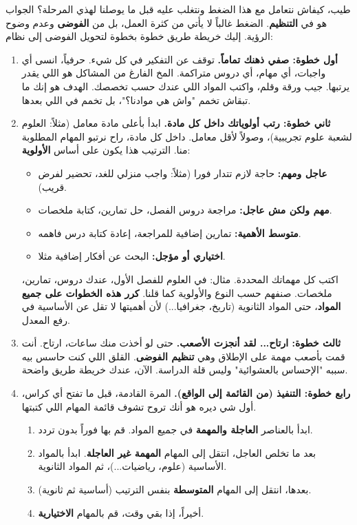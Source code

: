 \documentclass[12pt,a4paper]{book}
\begin{document}
	طيب، كيفاش نتعامل مع هذا الضغط ونتغلب عليه قبل ما يوصلنا لهذي المرحلة؟ الجواب هو في \textbf{التنظيم}. الضغط غالباً لا يأتي من كثرة العمل، بل من \textbf{الفوضى} وعدم وضوح الرؤية. إليك خريطة طريق خطوة بخطوة لتحويل الفوضى إلى نظام:
	
	\begin{enumerate}
		\item \textbf{أول خطوة: صفي ذهنك تماماً.}
		توقف عن التفكير في كل شيء. حرفياً، انسى أي واجبات، أي مهام، أي دروس متراكمة. المخ الفارغ من المشاكل هو اللي يقدر يرتبها. جيب ورقة وقلم، واكتب المواد اللي عندك حسب تخصصك. الهدف هو إنك ما تبقاش تخمم "واش هي موادنا؟"، بل تخمم في اللي بعدها.
		
		\item \textbf{ثاني خطوة: رتب أولوياتك داخل كل مادة.}
		ابدأ بأعلى مادة معامل (مثلاً: العلوم لشعبة علوم تجريبية)، وصولاً لأقل معامل. داخل كل مادة، راح نرتبو المهام المطلوبة منا. الترتيب هذا يكون على أساس \textbf{الأولوية}:
		\begin{itemize}
			\item \textbf{عاجل ومهم:} حاجة لازم تتدار فورا (مثلاً: واجب منزلي للغد، تحضير لفرض قريب).
			\item \textbf{مهم ولكن مش عاجل:} مراجعة دروس الفصل، حل تمارين، كتابة ملخصات.
			\item \textbf{متوسط الأهمية:} تمارين إضافية للمراجعة، إعادة كتابة درس فاهمه.
			\item \textbf{اختياري أو مؤجل:} البحث عن أفكار إضافية مثلا.
		\end{itemize}
		اكتب كل مهماتك المحددة. مثال: في العلوم للفصل الأول، عندك دروس، تمارين، ملخصات. صنفهم حسب النوع والأولوية كما قلنا. \textbf{كرر هذه الخطوات على جميع المواد}، حتى المواد الثانوية (تاريخ، جغرافيا...) لأن أهميتها لا تقل عن الأساسية في رفع المعدل.
		
		\item \textbf{ثالث خطوة: ارتاح... لقد أنجزت الأصعب.}
		حتى لو أخذت منك ساعات، ارتاح. أنت قمت بأصعب مهمة على الإطلاق وهي \textbf{تنظيم الفوضى}. القلق اللي كنت حاسس بيه سببه "الإحساس بالعشوائية" وليس قلة الدراسة. الآن، عندك خريطة طريق واضحة.
		
		\item \textbf{رابع خطوة: التنفيذ (من القائمة إلى الواقع).}
		المرة القادمة، قبل ما تفتح أي كراس، أول شي ديره هو أنك تروح تشوف قائمة المهام اللي كتبتها.
		\begin{enumerate}
			\item ابدأ بالعناصر \textbf{العاجلة والمهمة} في جميع المواد. قم بها فوراً بدون تردد.
			\item بعد ما تخلص العاجل، انتقل إلى المهام \textbf{المهمة غير العاجلة}. ابدأ بالمواد الأساسية (علوم، رياضيات...)، ثم المواد الثانوية.
			\item بعدها، انتقل إلى المهام \textbf{المتوسطة} بنفس الترتيب (أساسية ثم ثانوية).
			\item أخيراً، إذا بقي وقت، قم بالمهام \textbf{الاختيارية}.
		\end{enumerate}
	\end{enumerate}
	
\end{document}

